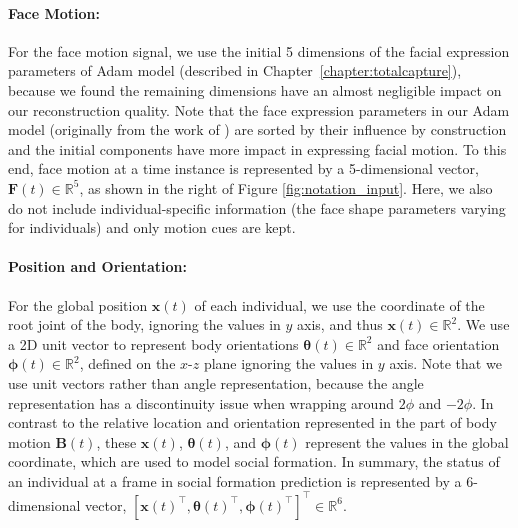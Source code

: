 \paragraph{Face Motion:} For the face motion signal, we use the initial 5 dimensions of the facial expression parameters of Adam model (described in Chapter~\ref{chapter:totalcapture}), because we found the remaining dimensions have an almost negligible impact on our reconstruction quality. Note that the face expression parameters in our Adam model (originally from the work of \cite{cao2014facewarehouse}) are sorted by their influence by construction and the initial components have more impact in expressing facial motion. To this end, face motion at a time instance is represented by a 5-dimensional vector, $\mathbf{F}(t) \in \mathbb{R}^{5}$, as shown in the right of Figure \ref{fig:notation_input}. Here, we also do not include individual-specific information (the face shape parameters varying for individuals) and only motion cues are kept.
 
\paragraph{Position and Orientation:} For the global position $\mathbf{x}(t)$ of each individual, we use the coordinate of the root joint of the body, ignoring the values in $y$ axis, and thus $\mathbf{x}(t) \in \mathbb{R}^2$.
We use a 2D unit vector to represent body orientations $\boldsymbol\theta (t) \in \mathbb {R}^2$ and face orientation $\boldsymbol\phi (t) \in \mathbb{R}^2$, defined on the $x$-$z$ plane ignoring the values in $y$ axis. Note that we use unit vectors rather than angle representation, because the angle representation has a discontinuity issue when wrapping around $2\phi$ and $-2\phi$. In contrast to the relative location and orientation represented in the part of body motion $\mathbf{B}(t)$, these $\mathbf{x}(t)$, $\boldsymbol\theta (t)$, and $\boldsymbol\phi (t)$ represent the values in the global coordinate, which are used to model social formation. In summary, the status of an individual at a frame in social formation prediction is represented by a 6-dimensional vector, $[\mathbf{x}(t)^{\top}, \boldsymbol{\theta}(t)^{\top}, \boldsymbol{\phi}(t)^{\top} ]^{\top} \in \mathbb{R}^6$.

